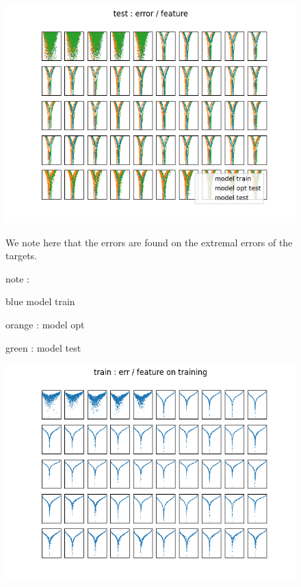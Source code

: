 \documentclass{article}
\begin{document}
\newpage

\newpage

\begin{figure}
\includegraphics[scale=1]{test_error_par_feature.png}

 We note here that the errors are found on the extremal errors of the targets.


note : 

blue model train

orange : model opt

green : model test
\end{figure}

\newpage


\begin{figure}
\includegraphics[scale=1]{train_error_par_feature.png}
\end{figure}
\end{document}
